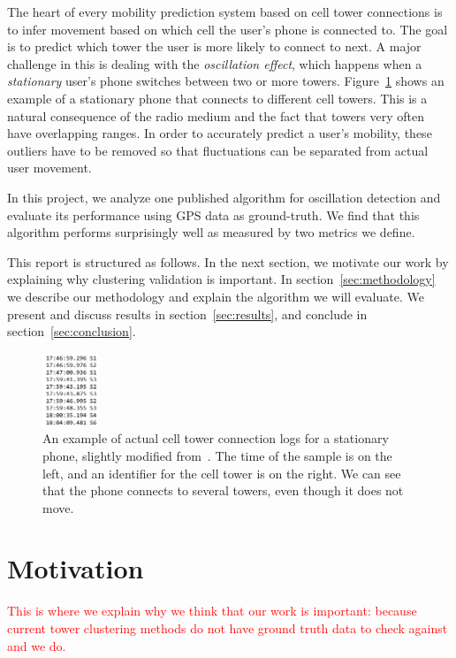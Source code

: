 \documentclass[letterpaper, 11pt, conference]{ieeeconf}
\newcommand{\xxx}[1]{\textcolor{red}{#1}}
\begin{document}
The heart of every mobility prediction system based on cell tower connections is to infer movement based on which cell the user's phone is connected to. The goal
is to predict which tower the user is more likely to connect to next. A major challenge in this is dealing with the \textit{oscillation effect}, which happens when a \textit{stationary} user's phone switches between two or more towers. Figure~\ref{fig:stationary} shows an example of a stationary phone that connects to different cell towers. This is a natural consequence of the radio medium and the fact that towers very often have overlapping ranges. In order to accurately predict a user's mobility, these outliers have to be removed so that fluctuations can be separated from actual user movement.

In this project, we analyze one published algorithm for oscillation detection \cite{mobilityprofiler} and evaluate its performance using GPS data as ground-truth. We find that this algorithm performs surprisingly well as measured by two metrics we define.

This report is structured as follows. In the next section, we motivate our work by explaining why clustering validation is important. In section~\ref{sec:methodology} we describe our methodology  and explain the algorithm we will evaluate. We present and discuss results in section~\ref{sec:results}, and conclude in section~\ref{sec:conclusion}.

\begin{figure}
\centering
\includegraphics[width=0.15\textwidth]{figs/stationary_oscillation}
\caption{An example of actual cell tower connection logs for a stationary phone, slightly modified from~\cite{LeapGraph}. The time of the sample is on the left, and an identifier for the cell tower is on the right. We can see that the phone connects to several towers, even though it does not move. }
\label{fig:stationary}
\end{figure}

\section{Motivation}

\xxx{This is where we explain why we think that our work is important: because current tower clustering methods do not have ground truth data to check against and we do.}
\end{document}
